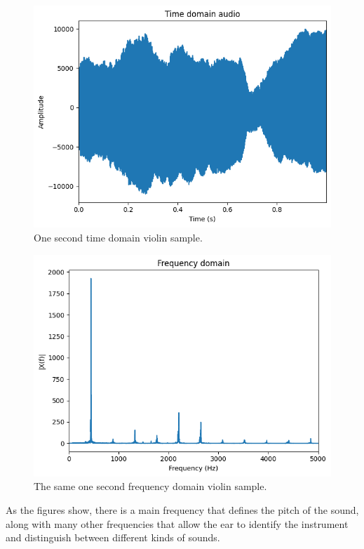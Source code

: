 \documentclass[sigconf,natbib=false]{acmart}
\begin{document}
\begin{figure}[h]
 \centering
 \includegraphics[width=\linewidth]{figs/time_domain_violin.png}
 \caption{One second time domain violin sample.}
\end{figure}

\begin{figure}[h]
 \centering
 \includegraphics[width=\linewidth]{figs/frequency_doimain_violin.png}
 \caption{The same one second frequency domain violin sample.}
\end{figure}

As the figures show, there is a main frequency that defines the pitch of the sound, along with many other frequencies that allow the ear to identify the instrument and distinguish between different kinds of sounds.
\end{document}
